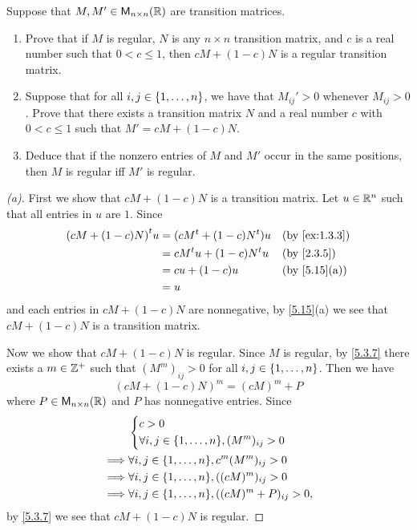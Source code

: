 \setcounter{ex}{18}
\begin{ex}\label{ex:5.3.19}
	Suppose that \(M, M' \in \mathsf{M}_{{n} \times n}({\mathbb{R}})\) are transition matrices.
	\begin{enumerate}
		\item Prove that if \(M\) is regular, \(N\) is any \(n \times n\) transition matrix, and \(c\) is a real number such that \(0 < c \leq 1\), then \(cM + (1 - c)N\) is a regular transition matrix.
		\item Suppose that for all \(i, j \in \left\lbrace1, \dots, n\right\rbrace\), we have that \(M_{i j}' > 0\) whenever \(M_{i j} > 0\).
		      Prove that there exists a transition matrix \(N\) and a real number \(c\) with \(0 < c \leq 1\) such that \(M' = cM + (1 - c)N\).
		\item Deduce that if the nonzero entries of \(M\) and \(M'\) occur in the same positions, then \(M\) is regular iff \(M'\) is regular.
	\end{enumerate}
\end{ex}

\begin{proof}[(a)]
	First we show that \(cM + (1 - c)N\) is a transition matrix.
	Let \(u \in \mathbb{R}^n\) such that all entries in \(u\) are \(1\).
	Since
	\begin{align*}
		\tp{(cM + (1 - c)N)} u & = (c \tp{M} + (1 - c) \tp{N}) u &  & \by{ex:1.3.3} \\
		                       & = c \tp{M} u + (1 - c) \tp{N} u &  & \by{2.3.5}    \\
		                       & = c u + (1 - c) u               &  & \by{5.15}[a]  \\
		                       & = u
	\end{align*}
	and each entries in \(cM + (1 - c)N\) are nonnegative, by \cref{5.15}(a) we see that \(cM + (1 - c)N\) is a transition matrix.

	Now we show that \(cM + (1 - c)N\) is regular.
	Since \(M\) is regular, by \cref{5.3.7} there exists a \(m \in \mathbb{Z}^+\) such that \((M^m)_{i j} > 0\) for all \(i, j \in \left\lbrace1, \dots, n\right\rbrace\).
	Then we have
	\[
		(cM + (1 - c)N)^m = (cM)^m + P
	\]
	where \(P \in \mathsf{M}_{{n} \times n}({\mathbb{R}})\) and \(P\) has nonnegative entries.
	Since
	\begin{align*}
		         & \begin{dcases}
			           c > 0 \\
			           \forall i, j \in \set{1, \dots, n}, (M^m)_{i j} > 0
		           \end{dcases}          \\
		\implies & \forall i, j \in \set{1, \dots, n}, c^m (M^m)_{i j} > 0     \\
		\implies & \forall i, j \in \set{1, \dots, n}, ((cM)^m)_{i j} > 0      \\
		\implies & \forall i, j \in \set{1, \dots, n}, ((cM)^m + P)_{i j} > 0,
	\end{align*}
	by \cref{5.3.7} we see that \(cM + (1 - c)N\) is regular.
\end{proof}

